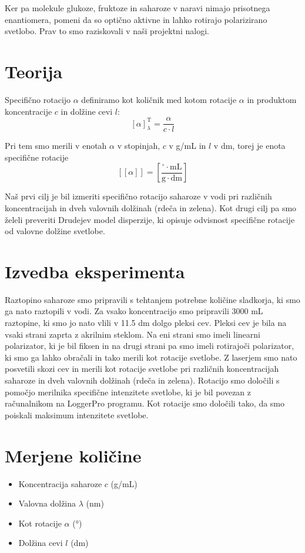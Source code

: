 \documentclass[a4paper,12pt]{article}
\begin{document}
Ker pa molekule glukoze, fruktoze in saharoze v naravi nimajo prisotnega enantiomera, pomeni da so optično aktivne in lahko rotirajo polarizirano svetlobo. Prav to smo raziskovali v naši projektni nalogi.

\section*{Teorija}

Specifično rotacijo $\alpha$ definiramo kot količnik med kotom rotacije $\alpha$ in produktom koncentracije $c$ in dolžine cevi $l$:
\[
[\alpha]^{\text{T}}_{\lambda}= \frac{\alpha}{c \cdot l}
\]

Pri tem smo merili v enotah $\alpha$ v stopinjah, $c$ v g/mL in $l$ v dm, torej je enota specifične rotacije 
\[
\left[ [\alpha] \right] = \left[ \frac{^\circ \cdot \mathrm{mL}}{\mathrm{g} \cdot \mathrm{dm}} \right]
\]


Naš prvi cilj je bil izmeriti specifično rotacijo saharoze v vodi pri različnih koncentracijah in dveh valovnih dolžinah (rdeča in zelena).
Kot drugi cilj pa smo želeli preveriti Drudejev model disperzije, ki opisuje odvisnost specifične rotacije od valovne dolžine svetlobe.

\section*{Izvedba eksperimenta}

Raztopino saharoze smo pripravili s tehtanjem potrebne količine sladkorja, ki smo ga nato raztopili v vodi. Za vsako koncentracijo smo pripravili 3000 mL raztopine, ki smo jo nato vlili v 11.5 dm dolgo pleksi cev.
Pleksi cev je bila na vsaki strani zaprta z akrilnim steklom. Na eni strani smo imeli linearni polarizator, ki je bil fiksen in na drugi strani pa smo imeli rotirajoči polarizator, ki smo ga lahko obračali in tako merili kot rotacije svetlobe.
Z laserjem smo nato posvetili skozi cev in merili kot rotacije svetlobe pri različnih koncentracijah saharoze in dveh valovnih dolžinah (rdeča in zelena). Rotacijo smo določili s 
pomočjo merilnika specifične intenzitete svetlobe, ki je bil povezan z računalnikom na LoggerPro programu. Kot rotacije smo določili tako, da smo poiskali maksimum intenzitete svetlobe.


\section*{Merjene količine}
\begin{itemize}
    \item Koncentracija saharoze $c$ (g/mL)
    \item Valovna dolžina $\lambda$ (nm)
    \item Kot rotacije $\alpha$ (°)
    \item Dolžina cevi $l$ (dm)
\end{itemize}
\end{document}
